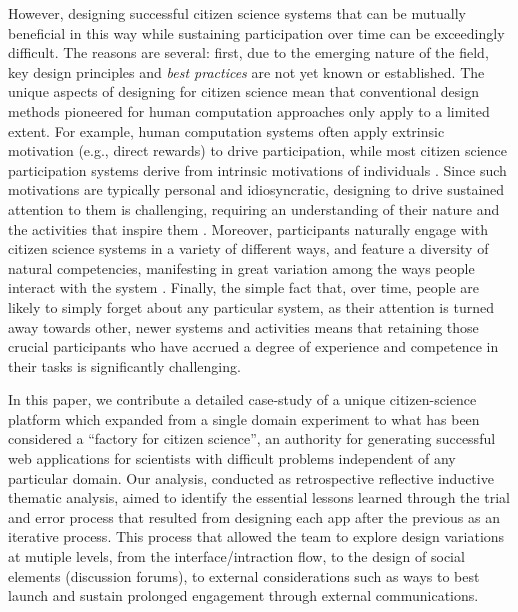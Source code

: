\documentclass{sigchi}
\begin{document}
However, designing successful citizen science systems that can be
mutually beneficial in this way while sustaining participation over
time can be exceedingly difficult.  The reasons are several: first,
due to the emerging nature of the field, key design principles and
\emph{best practices} are not yet known or established.  The unique
aspects of designing for citizen science mean that conventional design
methods pioneered for human computation approaches only apply to a
limited extent.  For example, human computation systems often apply
extrinsic motivation (e.g., direct rewards) to drive participation,
while most citizen science participation systems derive from intrinsic
motivations of individuals \cite{extrinsic-vs-intrinsic}.  Since such
motivations are typically personal and idiosyncratic, designing to
drive sustained attention to them is challenging, requiring an
understanding of their nature and the activities that inspire them
\cite{}.  Moreover, participants naturally engage with citizen science
systems in a variety of different ways, and feature a diversity of
natural competencies, manifesting in great variation among the ways
people interact with the system \cite{raddick}. Finally, the simple
fact that, over time, people are likely to simply forget about any
particular system, as their attention is turned away towards other,
newer systems and activities means that retaining those crucial
participants who have accrued a degree of experience and competence in
their tasks is significantly challenging.

In this paper, we contribute a detailed case-study of a unique
citizen-science platform which expanded from a single domain
experiment to what has been considered a ``factory for citizen
science'', an authority for generating successful web applications for
scientists with difficult problems independent of any particular
domain.  Our analysis, conducted as retrospective reflective inductive
thematic analysis, aimed to identify the essential lessons learned
through the trial and error process that resulted from designing each
app after the previous as an iterative process.  This process that
allowed the team to explore design variations at mutiple levels, from
the interface/intraction flow, to the design of social elements
(discussion forums), to external considerations such as ways to best
launch and sustain prolonged engagement through external
communications.
\end{document}
